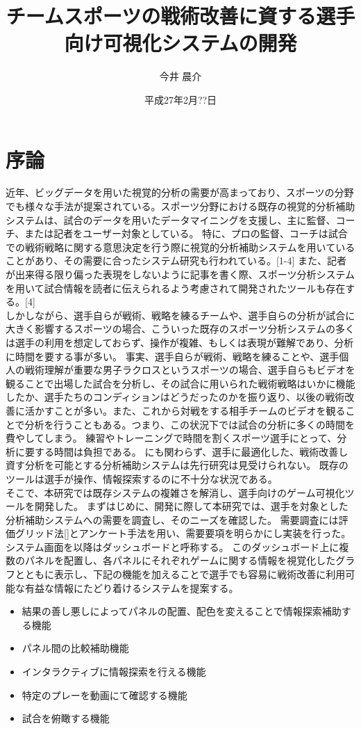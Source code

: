 \documentclass[sotsuron]{kuee}
\title{チームスポーツの戦術改善に資する選手向け可視化システムの開発}
\author{今井 晨介}
\date{平成27年2月??日}
\begin{document}
\maketitle	
\tableofcontents

\chapter{序論}
近年、ビッグデータを用いた視覚的分析の需要が高まっており、スポーツの分野でも様々な手法が提案されている。スポーツ分野における既存の視覚的分析補助システムは、試合のデータを用いたデータマイニングを支援し、主に監督、コーチ、または記者をユーザー対象としている。
特に、プロの監督、コーチは試合での戦術戦略に関する意思決定を行う際に視覚的分析補助システムを用いていることがあり、その需要に合ったシステム研究も行われている。[1-4]
また、記者が出来得る限り偏った表現をしないように記事を書く際、スポーツ分析システムを用いて試合情報を読者に伝えられるよう考慮されて開発されたツールも存在する。[4]
\\しかしながら、選手自らが戦術、戦略を練るチームや、選手自らの分析が試合に大きく影響するスポーツの場合、こういった既存のスポーツ分析システムの多くは選手の利用を想定しておらず、操作が複雑、もしくは表現が難解であり、分析に時間を要する事が多い。
事実、選手自らが戦術、戦略を練ることや、選手個人の戦術理解が重要な男子ラクロスというスポーツの場合、選手自らもビデオを観ることで出場した試合を分析し、その試合に用いられた戦術戦略はいかに機能したか、選手たちのコンディションはどうだったのかを振り返り、以後の戦術改善に活かすことが多い。また、これから対戦をする相手チームのビデオを観ることで分析を行うこともある。つまり、この状況下では試合の分析に多くの時間を費やしてしまう。
練習やトレーニングで時間を割くスポーツ選手にとって、分析に要する時間は負担である。
にも関わらず、選手に最適化した、戦術改善し資す分析を可能とする分析補助システムは先行研究は見受けられない。
既存のツールは選手が操作、情報探索するのに不十分な状況である。
\\そこで、本研究では既存システムの複雑さを解消し、選手向けのゲーム可視化ツールを開発した。
まずはじめに、開発に際して本研究では、選手を対象とした分析補助システムへの需要を調査し、そのニーズを確認した。
需要調査には評価グリッド法[]とアンケート手法を用い、需要要項を明らかにし実装を行った。
システム画面を以降はダッシュボードと呼称する。
このダッシュボード上に複数のパネルを配置し、各パネルにそれぞれゲームに関する情報を視覚化したグラフとともに表示し、下記の機能を加えることで選手でも容易に戦術改善に利用可能な有益な情報にたどり着けるシステムを提案する。
\begin{itemize}
\item 結果の善し悪しによってパネルの配置、配色を変えることで情報探索補助する機能
\item パネル間の比較補助機能
\item インタラクティブに情報探索を行える機能
\item 特定のプレーを動画にて確認する機能
\item 試合を俯瞰する機能
\end{itemize}
\end{document}
